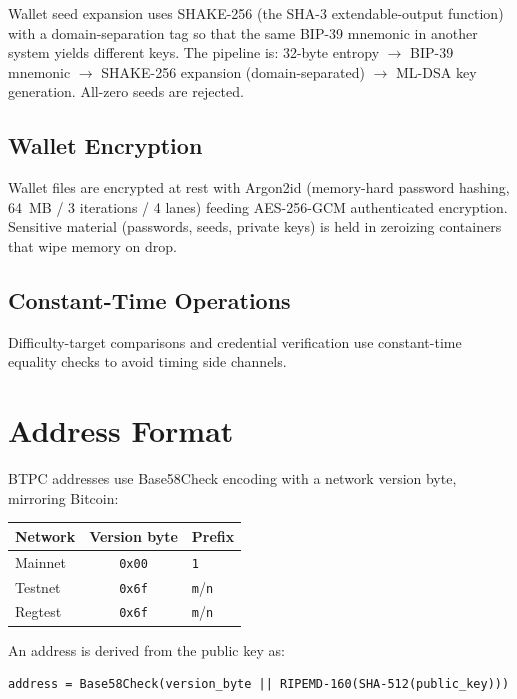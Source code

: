 \documentclass[11pt,a4paper]{article}
\begin{document}
Wallet seed expansion uses SHAKE-256 (the SHA-3 extendable-output function) with a domain-separation tag so that the same BIP-39 mnemonic in another system yields different keys. The pipeline is: 32-byte entropy $\to$ BIP-39 mnemonic $\to$ SHAKE-256 expansion (domain-separated) $\to$ ML-DSA key generation. All-zero seeds are rejected.

\subsection{Wallet Encryption}

Wallet files are encrypted at rest with Argon2id (memory-hard password hashing, 64~MB / 3 iterations / 4 lanes) feeding AES-256-GCM authenticated encryption. Sensitive material (passwords, seeds, private keys) is held in zeroizing containers that wipe memory on drop.

\subsection{Constant-Time Operations}

Difficulty-target comparisons and credential verification use constant-time equality checks to avoid timing side channels.

\section{Address Format}

BTPC addresses use Base58Check encoding with a network version byte, mirroring Bitcoin:

\begin{center}
\begin{tabular}{lcl}
\toprule
\textbf{Network} & \textbf{Version byte} & \textbf{Prefix} \\
\midrule
Mainnet & \texttt{0x00} & \texttt{1} \\
Testnet & \texttt{0x6f} & \texttt{m}/\texttt{n} \\
Regtest & \texttt{0x6f} & \texttt{m}/\texttt{n} \\
\bottomrule
\end{tabular}
\end{center}

An address is derived from the public key as:

\begin{verbatim}
address = Base58Check(version_byte || RIPEMD-160(SHA-512(public_key)))
\end{verbatim}
\end{document}

